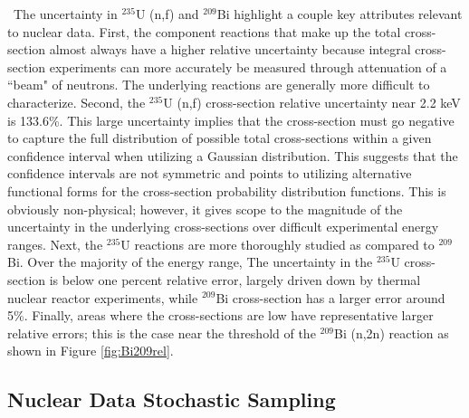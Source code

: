 \ The uncertainty in $\mathrm{^{235}}$U (n,f)  and $\mathrm{^{209}}$Bi highlight a couple key attributes relevant to nuclear data. 
First, the component reactions that make up the total cross-section almost always have a higher relative uncertainty because integral cross-section experiments can more accurately be measured through attenuation of a ``beam" of neutrons. 
The underlying reactions are generally more difficult to characterize. 
Second, the $\mathrm{^{235}}$U (n,f) cross-section relative uncertainty near 2.2 keV is 133.6\%. 
This large uncertainty implies that the cross-section must go negative to capture the full distribution of possible total cross-sections within a given confidence interval when utilizing a Gaussian distribution.
This suggests that the confidence intervals are not symmetric and points to utilizing alternative functional forms for the cross-section probability distribution functions. 
This is obviously non-physical; however, it gives scope to the magnitude of the uncertainty in the underlying cross-sections over difficult experimental energy ranges. 
Next, the $\mathrm{^{235}}$U reactions are more thoroughly studied as compared to $\mathrm{^{209}}$Bi. 
Over the majority of the energy range, The uncertainty in the $\mathrm{^{235}}$U cross-section is below one percent relative error, largely driven down by thermal nuclear reactor experiments, while $\mathrm{^{209}}$Bi cross-section has a larger error around 5\%. 
Finally, areas where the cross-sections are low have representative larger relative errors; this is the case near the threshold of the $\mathrm{^{209}}$Bi (n,2n) reaction as shown in Figure \ref{fig:Bi209rel}. 

\subsection{Nuclear Data Stochastic Sampling}

